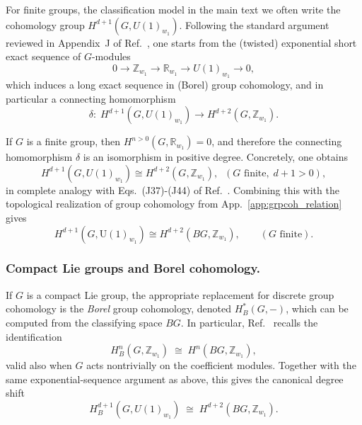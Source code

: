 \documentclass[aps,prx,reprint,superscriptaddress,twocolumn,amsmath,amssymb,amsfonts, nofootinbib]{revtex4-2}
\newcommand{\U}{\text{U}}
\theoremstyle{apsstyle}
\begin{document}
For finite groups, the classification model in the main text we often write the cohomology group $H^{d+1}(G,U(1)_{w_1})$. Following the standard argument reviewed in Appendix~J of Ref.~\cite{Chen2013}, one starts from the (twisted) exponential short exact sequence of $G$-modules
\begin{equation}
    0 \longrightarrow \mathbb{Z}_{w_1} \longrightarrow \mathbb{R}_{w_1}
    \longrightarrow U(1)_{w_1} \longrightarrow 0,
\end{equation}
which induces a long exact sequence in (Borel) group cohomology, and in particular a connecting homomorphism
\begin{equation}
\label{eq:delta_exp}
    \delta:\;H^{d+1}(G,U(1)_{w_1}) \longrightarrow H^{d+2}(G,\mathbb{Z}_{w_1}).
\end{equation}

\medskip

\noindent If $G$ is a finite group, then $H^{n>0}(G,\mathbb{R}_{w_1})=0$, and therefore the connecting homomorphism $\delta$ is an isomorphism in positive degree. Concretely, one obtains
\begin{equation}
\label{eq:U1_to_Z_finite}
    H^{d+1}(G,U(1)_{w_1}) \cong H^{d+2}(G,\mathbb{Z}_{w_1}),
    \;\; (G\text{ finite},\; d+1>0),
\end{equation}
in complete analogy with Eqs.~(J37)-(J44) of Ref.~\cite{Chen2013}. Combining this with the topological realization of group cohomology from App.~\ref{app:grpcoh_relation} gives
\begin{equation}
    H^{d+1}(G,\U(1)_{w_1}) \cong H^{d+2}(BG,\mathbb{Z}_{w_1}), 
    \qquad (G\text{ finite}).
    \label{eq:G_finite}
\end{equation}

\subsubsection{Compact Lie groups and Borel cohomology.}
\label{app:Borel_compact_Lie}

If $G$ is a compact Lie group, the appropriate replacement for discrete group cohomology is the \emph{Borel} group cohomology, denoted $H^\ast_B(G,-)$, which can be computed from the classifying space $BG$. In particular, Ref.~\cite{Chen2013} recalls the identification
\begin{equation}
    H^n_B(G,\mathbb{Z}_{w_1}) \;\cong\; H^n(BG,\mathbb{Z}_{w_1}),
\end{equation}
valid also when $G$ acts nontrivially on the coefficient modules. Together with the same exponential-sequence argument as above, this gives the canonical degree shift
\begin{equation}
    H^{d+1}_B(G,U(1)_{w_1})
    \;\cong\;
    H^{d+2}(BG,\mathbb{Z}_{w_1}).
    \label{eq:G_compactLie}
\end{equation}
\end{document}
